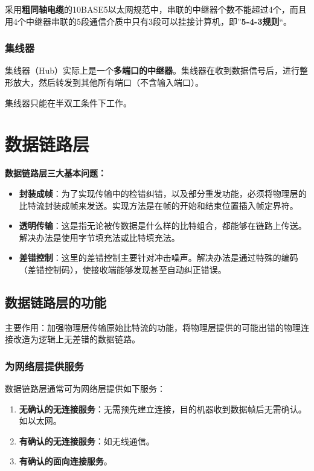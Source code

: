 \documentclass[12pt, a4paper, oneside]{ctexart}
\begin{document}
采用\textbf{粗同轴电缆}的10BASE5以太网规范中，串联的中继器个数不能超过4个，而且用4个中继器串联的5段通信介质中只有3段可以挂接计算机，即”\textbf{5-4-3规则}“。

\subsubsection{集线器}

集线器（Hub）实际上是一个\textbf{多端口的中继器}。集线器在收到数据信号后，进行整形放大，然后转发到其他所有端口（不含输入端口）。

集线器只能在半双工条件下工作。

\section{数据链路层}

\textbf{数据链路层三大基本问题：}
\begin{itemize}
    \item {\bf 封装成帧}：为了实现传输中的检错纠错，以及部分重发功能，必须将物理层的比特流封装成帧来发送。实现方法是在帧的开始和结束位置插入帧定界符。
    \item {\bf 透明传输}：这是指无论被传数据是什么样的比特组合，都能够在链路上传送。解决办法是使用字节填充法或比特填充法。
    \item {\bf 差错控制}：这里的差错控制主要针对冲击噪声。解决办法是通过特殊的编码（差错控制码），使接收端能够发现甚至自动纠正错误。
\end{itemize}

\subsection{数据链路层的功能}

主要作用：加强物理层传输原始比特流的功能，将物理层提供的可能出错的物理连接改造为逻辑上无差错的数据链路。

\subsubsection{为网络层提供服务}

数据链路层通常可为网络层提供如下服务：
\begin{enumerate}
    \item {\bf 无确认的无连接服务}：无需预先建立连接，目的机器收到数据帧后无需确认。如以太网。
    \item {\bf 有确认的无连接服务}：如无线通信。
    \item {\bf 有确认的面向连接服务}。
\end{enumerate}
\end{document}
